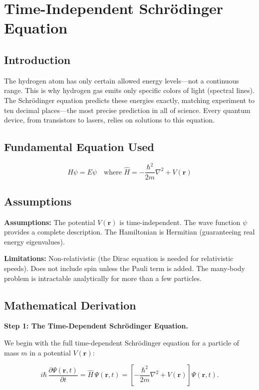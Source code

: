 \chapter{Time-Independent Schr\"odinger Equation}

\section*{Introduction}

The hydrogen atom has only certain allowed energy levels---not a continuous range. This is why hydrogen gas emits only specific colors of light (spectral lines). The Schr\"odinger equation predicts these energies exactly, matching experiment to ten decimal places---the most precise prediction in all of science. Every quantum device, from transistors to lasers, relies on solutions to this equation.

\section*{Fundamental Equation Used}

\[
\hat{H}\psi = E\psi \quad \text{where } \hat{H} = -\frac{\hbar^2}{2m}\nabla^2 + V(\mathbf{r})
\]
\section*{Assumptions}

\textbf{Assumptions:} The potential $V(\mathbf{r})$ is time-independent. The wave function $\psi$ provides a complete description. The Hamiltonian is Hermitian (guaranteeing real energy eigenvalues).


\textbf{Limitations:} Non-relativistic (the Dirac equation is needed for relativistic speeds). Does not include spin unless the Pauli term is added. The many-body problem is intractable analytically for more than a few particles.


\section*{Mathematical Derivation}

\textbf{Step 1: The Time-Dependent Schr\"odinger Equation.}

We begin with the full time-dependent Schr\"odinger equation for a particle of mass $m$ in a potential $V(\mathbf{r})$:

\begin{equation}
i\hbar\,\frac{\partial \Psi(\mathbf{r}, t)}{\partial t} = \hat{H}\,\Psi(\mathbf{r}, t) = \left[-\frac{\hbar^2}{2m}\nabla^2 + V(\mathbf{r})\right]\Psi(\mathbf{r}, t).
\end{equation}

